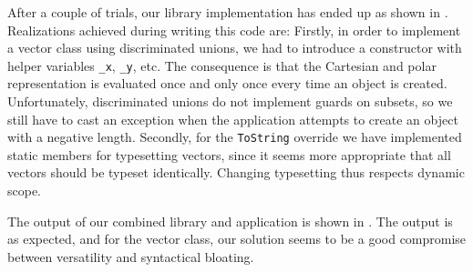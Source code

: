 \documentclass[fsharpNotes.tex]{subfiles}
\begin{document}
After a couple of trials, our library implementation has ended up as shown in .
%
%
Realizations achieved during writing this code are: Firstly, in order to implement a vector class using discriminated unions, we had to introduce a constructor with helper variables \lstinline{_x}, \lstinline{_y}, etc. The consequence is that the Cartesian and polar representation is evaluated once and only once every time an object is created. Unfortunately, discriminated unions do not implement guards on subsets, so we still have to cast an exception when the application attempts to create an object with a negative length. Secondly, for the \lstinline{ToString} override we have implemented static members for typesetting vectors, since it seems more appropriate that all vectors should be typeset identically. Changing typesetting thus respects dynamic scope.

The output of our combined library and application is shown in .
%
%
The output is as expected, and for the vector class, our solution seems to be a good compromise between versatility and syntactical bloating.
\end{document}
